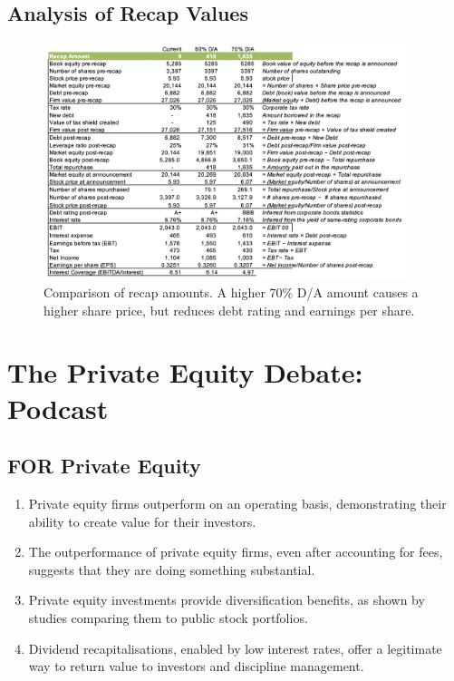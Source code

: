 \subsection*{Analysis of Recap Values}
\begin{figure}[H]
    \centering
    \includegraphics[width=0.95\textwidth]{img/8.4.4.png}
    \caption{Comparison of recap amounts. A higher 70\% D/A amount causes a higher share price, but reduces debt rating and earnings per share.}
\end{figure}

\section{The Private Equity Debate: Podcast}
\subsection*{FOR Private Equity}

\begin{enumerate}
    \item Private equity firms outperform on an operating basis, demonstrating their ability to create value for their investors.
    \item The outperformance of private equity firms, even after accounting for fees, suggests that they are doing something substantial.
    \item Private equity investments provide diversification benefits, as shown by studies comparing them to public stock portfolios.
    \item Dividend recapitalisations, enabled by low interest rates, offer a legitimate way to return value to investors and discipline management.
\end{enumerate}

